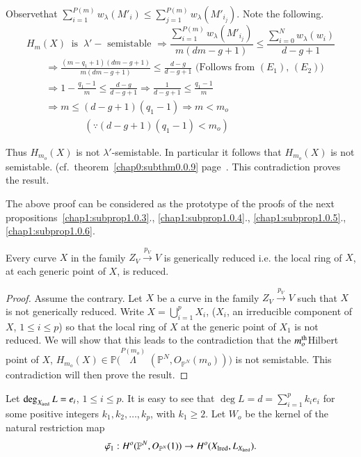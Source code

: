 \noindent
Observe\pageoriginale that $\sum\limits_{i=1}^{P(m)} w_{\lambda}
(M'_i) \le 
\sum\limits_{j=1}^{P(m)} w_\lambda(M'_{i_j})$. Note the following.   
$$
H_m(X) ~ \text{ is  }~ \lambda'-\text{ semistable } \Rightarrow 
\frac{\sum\limits_{i=1}^{P(m)} w_ \lambda (M'_{i_j})}{m(dm-g+1)} \le
\frac{\sum\limits_{i=0}^{N} w_\lambda (w_i)}{d-g+1} 
$$
\begin{align*}
& \Rightarrow \frac{(m- q_1+1) (dm-g+1)}{m(dm-g+1)} \le
  \frac{d-g}{d-g+1} \text{ (Follows from $(E_1)$, $(E_2)$)}\\ 
& \Rightarrow 1 - \frac{q_1-1}{m}   \le \frac{d-g}{d-g+1} \Rightarrow
  \frac{1}{d-g+1} \le \frac{q_1-1}{m}\\ 
& \Rightarrow m \le (d-g+1) (q_1-1) \Rightarrow m < m_o \\
& \qquad \qquad (\because (d-g+1)(q_1-1) < m_o)
\end{align*}

\noindent
Thus $H_{m_o}(X)$ is not $\lambda'$-semistable. In particular it
follows that $H_{m_o}(X)$ is not semistable. (cf.\ 
theorem~\ref{chap0:subthm0.0.9} page~\pageref{chap0:subthm0.0.9}. 
This contradiction proves the result.   

The above proof can be considered as the prototype of the proofs of
the next propositions~\ref{chap1:subprop1.0.3}.,
\ref{chap1:subprop1.0.4}., \ref{chap1:subprop1.0.5}.,
\ref{chap1:subprop1.0.6}.   

\begin{subprop}\label{chap1:subprop1.0.3}%
Every curve $X$ in the family $Z_V \xrightarrow{p_V}V$ is generically
reduced i.e. the local ring of $X$, at each generic point of $X$, is
reduced. 
\end{subprop}


\begin{proof}
Assume the contrary. Let $X$ be a curve in the family $Z_V
\xrightarrow{p_V}V$ such that $X$ is not generically reduced. Write
$X= \bigcup\limits_{i=1}^{p}X_i$, ($X_i$, an irreducible component of
$X$, $1 \le i \le p$) so that the local ring of $X$ at the generic point of
$X_1$ is not reduced. We will show that this leads to the
contradiction that the $m^{\rm th}_o$\pageoriginale Hilbert point of
$X$, $H_{m_o}(X) 
\in \mathbb{P} (\overset{P(m_o)} \Lambda$ $( \mathbb{P}^N,
O_{\mathbb{P}^N}(m_o)))$ is not semistable. This contradiction will 
then prove the result.   
\end{proof}

Let $\deg_{X_{\rm ired}} L = e_i$, $1 \le i \le p$. It is easy to see that
$\deg L = d = \sum\limits^{p}_{i=1} k_i e_i$ for some positive integers
$k_1, k_2 , \ldots ,k_p$, with $k_1 \ge 2$. Let $W_o$ be the kernel of
the natural restriction map  
$$
\bar{\varphi_1} : H^o(\mathbb{P}^N, O_{\mathbb{P}^N} (1)) \to H^o
(X_{\rm lred}, L_{X_{\rm lred}}). 
$$

